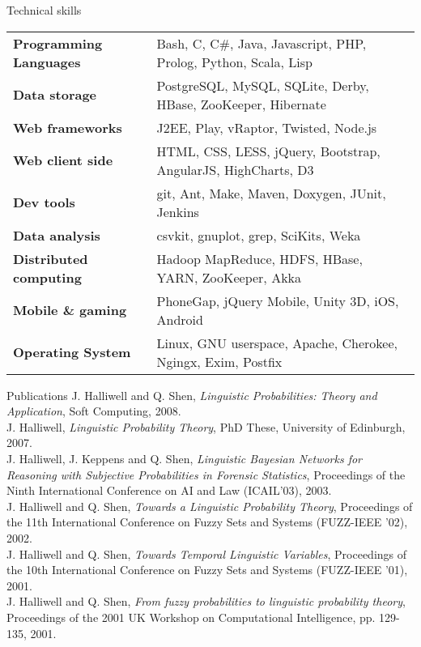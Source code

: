 \documentclass{resume} %
\begin{document}

\begin{rSection}{Technical skills}

\begin{tabular}{ @{} >{\bfseries}l @{\hspace{6ex}} l }
Programming Languages & Bash, C, C\#, Java, Javascript, PHP, Prolog, Python, Scala, Lisp \\
Data storage & PostgreSQL, MySQL, SQLite, Derby, HBase, ZooKeeper, Hibernate \\
Web frameworks & J2EE, Play, vRaptor, Twisted, Node.js \\
Web client side & HTML, CSS, LESS, jQuery, Bootstrap, AngularJS, HighCharts, D3 \\
Dev tools & git, Ant, Make, Maven, Doxygen, JUnit, Jenkins \\
Data analysis & csvkit, gnuplot, grep, SciKits, Weka \\
Distributed computing & Hadoop MapReduce, HDFS, HBase, YARN, ZooKeeper, Akka \\
Mobile \& gaming & PhoneGap, jQuery Mobile, Unity 3D, iOS, Android \\
Operating System & Linux, GNU userspace, Apache, Cherokee, Ngingx, Exim, Postfix
\end{tabular}

\end{rSection}


\begin{rSection}{Publications}
J. Halliwell and Q. Shen, {\em Linguistic Probabilities: Theory and Application}, Soft Computing, 2008.\\
J. Halliwell, {\em Linguistic Probability Theory}, PhD These, University of Edinburgh, 2007.\\
J. Halliwell, J. Keppens and Q. Shen, {\em Linguistic Bayesian Networks for Reasoning with
Subjective Probabilities in Forensic Statistics}, Proceedings of the Ninth International
Conference on AI and Law (ICAIL'03), 2003.\\
J. Halliwell and Q. Shen, {\em Towards a Linguistic Probability Theory}, Proceedings of the
11th International Conference on Fuzzy Sets and Systems (FUZZ-IEEE '02), 2002.\\
J. Halliwell and Q. Shen, {\em Towards Temporal Linguistic Variables}, Proceedings of the
10th International Conference on Fuzzy Sets and Systems (FUZZ-IEEE '01), 2001.\\
J. Halliwell and Q. Shen, {\em From fuzzy probabilities to linguistic probability theory},
Proceedings of the 2001 UK Workshop on Computational Intelligence, pp. 129-135,
2001.\\
\end{rSection}
\end{document}

